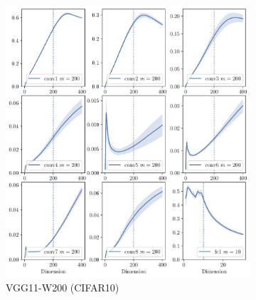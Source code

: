 \begin{figure}[H]
\begin{subfigure}[b]{0.48\textwidth}
        \includegraphics[width=\textwidth]{Appendix_Figures/Overlap_large_model/overlap_raw/DimOverlap_CIFAR10_VGG11W200_fxlr0.01_appendix_vertical_3col.pdf}
        \caption{VGG11-W200 (CIFAR10)}
        \label{fig:app_adexp_cifar10_vgg200}
    \end{subfigure}
    \\\vspace{0.1in}
    \begin{subfigure}[b]{0.48\textwidth}
        \centering
        \captionsetup{justification=centering}

\end{subfigure}
\end{figure}
